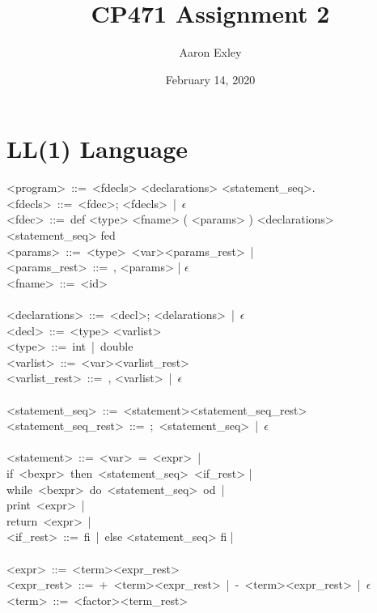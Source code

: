 \documentclass{article}
\title{CP471 Assignment 2}
\date{February 14, 2020}
\author{Aaron Exley}
\begin{document}
\maketitle

\section*{LL(1) Language}

\noindent
<program>\ ::=\ <fdecls> <declarations> <statement\_seq>.\\
<fdecls>\ ::=\ <fdec>; <fdecls>\ |\ $\epsilon$ \\
<fdec>\ ::=\ def <type> <fname> ( <params> ) <declarations> <statement\_seq> fed\\
<params>\ ::=\ <type>\ <var><params\_rest>\ |\\
<params\_rest>\ ::=\ , <params> | $\epsilon$ \\
<fname>\ ::=\ <id>\\
\\
<declarations>\ ::=\ <decl>; <delarations>\ |\ $\epsilon$\\
<decl>\ ::=\ <type> <varlist>\\
<type>\ ::=\ int\ |\ double\\
<varlist>\ ::=\ <var><varlist\_rest>\\
<varlist\_rest>\ ::=\ , <varlist>\ |\ $\epsilon$\\
\\
<statement\_seq>\ ::=\ <statement><statement\_seq\_rest>\\
<statement\_seq\_rest>\ ::=\ ;\ <statement\_seq>\ |\ $\epsilon$\\
\\
<statement>\ ::=\ <var>\ =\ <expr>\ |\\
\null\qquad\qquad\qquad\qquad if\ <bexpr>\ then\ <statement\_seq>\ <if\_rest> |\\
\null\qquad\qquad\qquad\qquad while\ <bexpr>\ do\ <statement\_seq>\ od\ |\\
\null\qquad\qquad\qquad\qquad print\ <expr>\ |\\
\null\qquad\qquad\qquad\qquad return\ <expr>\ |\\
<if\_rest>\ ::=\ fi\ |\ else <statement\_seq> fi |\\
\\
<expr>\ ::=\ <term><expr\_rest>\\
<expr\_rest>\ ::=\ +\ <term><expr\_rest>\ |\ -\ <term><expr\_rest>\ |\ $\epsilon$\\
<term>\ ::=\ <factor><term\_rest>\\
\end{document}
